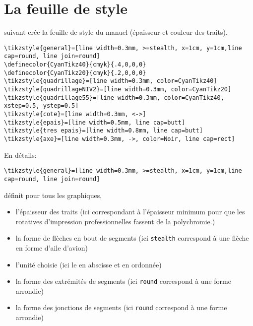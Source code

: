 \documentclass[nocrop]{sesamanuel}
\begin{document}
\section{La feuille de style}
\begin{code} suivant crée la feuille de style du manuel (épaisseur et couleur des traits).
\begin{verbatim}
\tikzstyle{general}=[line width=0.3mm, >=stealth, x=1cm, y=1cm,line cap=round, line join=round]
\definecolor{CyanTikz40}{cmyk}{.4,0,0,0}
\definecolor{CyanTikz20}{cmyk}{.2,0,0,0}
\tikzstyle{quadrillage}=[line width=0.3mm, color=CyanTikz40]
\tikzstyle{quadrillageNIV2}=[line width=0.3mm, color=CyanTikz20]
\tikzstyle{quadrillage55}=[line width=0.3mm, color=CyanTikz40, xstep=0.5, ystep=0.5]
\tikzstyle{cote}=[line width=0.3mm, <->]
\tikzstyle{epais}=[line width=0.5mm, line cap=butt]
\tikzstyle{tres epais}=[line width=0.8mm, line cap=butt]
\tikzstyle{axe}=[line width=0.3mm, ->, color=Noir, line cap=rect]
\end{verbatim}
\end{code}

En détails: 

\begin{syntaxe}\begin{verbatim}                
\tikzstyle{general}=[line width=0.3mm, >=stealth, x=1cm, y=1cm,line cap=round, line join=round]
               \end{verbatim}

définit pour tous les graphiques, 

\begin{itemize}
 \item l'épaisseur des traits (ici  correspondant à l'épaisseur minimum pour que les rotatives d'impression professionnelles fassent de la polychromie.)

\item la forme de flèches en bout de segments (ici \verb+stealth+ correspond à une flèche en forme d'aile d'avion)

\item l'unité choisie (ici le \ucm{} en abscisse et en ordonnée)

\item la forme des extrémités de segments (ici \verb+round+ correspond à une forme arrondie)
\item la forme des jonctions de segments (ici \verb+round+ correspond à une forme arrondie)
\end{itemize}
\end{syntaxe}
\end{document}
